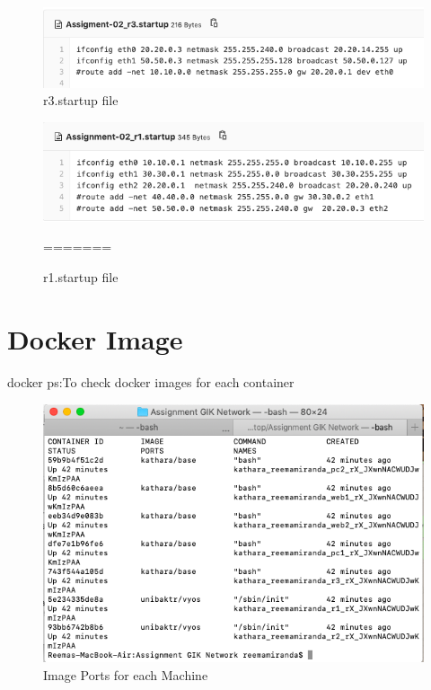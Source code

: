 \begin{figure}[H]
\centering
  \includegraphics[width=400pt]{Images/r3.startup.png}
  \caption{r3.startup file}
  \label{fig:2.9}
\end{figure}
\begin{figure}[H]
\centering
  \includegraphics[width=400pt]{Images/r1.startup.png}
  \caption{r1.startup file}
  \label{fig:2.10}
=======
  \label{fig:3.2}
\end{figure}
\section{Docker Image}
\paragraph{}
docker ps:To check docker images for each container
 \begin{figure}[H]
\centering
  \includegraphics[width=400pt]{Images/docker ps.png}
  \caption{Image Ports for each Machine}
  \label{fig:3.4}
\end{figure}
